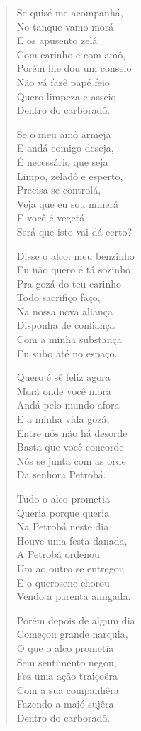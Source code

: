 \begin{verse}
Se quisé me acompanhá,\\
No tanque vamo morá\\
E os apusento zelá\\
Com carinho e com amô,\\
Porém lhe dou um conseio\\
Não vá fazê papé feio\\
Quero limpeza e asseio\\
Dentro do carboradô.

Se o meu amô armeja\\
E andá comigo deseja,\\
É necessário que seja\\
Limpo, zeladô e esperto,\\
Precisa se controlá,\\
Veja que eu sou minerá\\
E você é vegetá,\\
Será que isto vai dá certo?

Disse o alco: meu benzinho\\
Eu não quero é tá sozinho\\
Pra gozá do teu carinho\\
Todo sacrifiço faço,\\
Na nossa nova aliança\\
Disponha de confiança\\
Com a minha substança\\
Eu subo até no espaço.

Quero é sê feliz agora\\
Morá onde você mora\\
Andá pelo mundo afora\\
E a minha vida gozá,\\
Entre nós não há desorde\\
Basta que você concorde\\
Nós se junta com as orde\\
Da senhora Petrobá.

Tudo o alco prometia\\
Queria porque queria\\
Na Petrobá neste dia\\
Houve uma festa danada,\\
A Petrobá ordenou\\
Um ao outro se entregou\\
E o querosene chorou\\
Vendo a parenta amigada.

Porém depois de algum dia\\
Começou grande narquia,\\
O que o alco prometia\\
Sem sentimento negou,\\
Fez uma ação traiçoêra\\
Com a sua companhêra\\
Fazendo a maió sujêra\\
Dentro do carboradô.


\end{verse}
